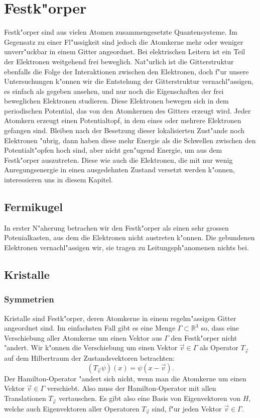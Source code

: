 \chapter{Festk"orper\label{chapter:festkoerper}}
\rhead{}
Festk"orper sind aus vielen Atomen zusammengesetzte Quantensysteme.
Im Gegensatz zu einer Fl"ussigkeit sind jedoch die Atomkerne mehr
oder weniger unverr"uckbar in einem Gitter angeordnet.
Bei elektrischen Leitern ist ein Teil der Elektronen weitgehend frei
beweglich.
Nat"urlich ist die Gitterstruktur ebenfalls die Folge der Interaktionen
zwischen den Elektronen, doch f"ur unsere Untersuchungen k"onnen wir
die Entstehung der Gitterstruktur vernachl"assigen, es einfach als
gegeben ansehen, und nur noch die Eigenschaften der frei beweglichen
Elektronen studieren.
Diese Elektronen bewegen sich in dem periodischen Potential, das von
den Atomkernen des Gitters erzeugt wird.
Jeder Atomkern erzeugt einen Potentialtopf, in dem eines oder mehrere
Elektronen gefangen sind.
Bleiben nach der Besetzung dieser lokalisierten Zust"ande noch
Elektronen "ubrig, dann haben diese mehr Energie als die Schwellen zwischen
den Potentialt"opfen hoch sind, aber nicht gen"ugend Energie, um
aus dem Festk"orper auszutreten.
Diese wie auch die Elektronen, die mit nur wenig Anregungsenergie
in einen ausgedehnten Zustand versetzt werden k"onnen, interessieren
uns in diesem Kapitel.

\section{Fermikugel}
In erster N"aherung betrachen wir den Festk"orper als einen
sehr grossen Potenialkasten, aus dem die Elektronen nicht austreten
k"onnen.
Die gebundenen Elektronen vernachl"assigen wir, sie tragen zu
Leitungsph"anomenen nichts bei.

\section{Kristalle}
\subsection{Symmetrien}
Kristalle sind Festk"orper, deren Atomkerne in einem regelm"assigen
Gitter angeordnet sind.
Im einfachsten Fall gibt es eine Menge 
$ \Gamma  \subset \mathbb R^3 $
so, dass eine Verschiebung aller Atomkerne um einen Vektor aus $\Gamma$
den Festk"orper nicht "andert.
Wir k"onnen die Verschiebung um einen Vektor $\vec v\in\Gamma$ als
Operator $T_{\vec v}$ auf dem Hilbertraum der Zustandsvektoren
betrachten:
\[
(T_{\vec v}\psi)(x)=\psi(x-\vec v).
\]
Der Hamilton-Operator "andert sich nicht, wenn man die Atomkerne um
einen Vektor $\vec v\in\Gamma$ verschiebt.
Also muss der Hamilton-Operator mit allen Translationen $T_{\vec v}$ 
vertauschen.
Es gibt also eine Basis von Eigenvektoren von $H$, welche auch
Eigenvektoren aller Operatoren $T_{\vec v}$ sind, f"ur jeden Vektor
$\vec v\in\Gamma$.

